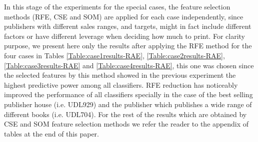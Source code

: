 \documentclass[a4paper,10pt,twocolumn,preprint,3p]{elsarticle}
\begin{document}
In this stage of the experiments for the special cases, the
feature selection methods (RFE, CSE and SOM) are applied for each case
independently, since publishers with different sales ranges, and
targets, might in fact include different factors or have different
leverage when deciding how much to print. For clarity purpose, we present 
here only the results after applying the RFE method for the four cases in Tables
\ref{Table:case1results-RAE}, \ref{Table:case2results-RAE},
\ref{Table:case3results-RAE} and \ref{Table:case4results-RAE}, this
one was chosen since the selected features by this
method showed in the previous experiment the highest predictive power among 
all classifiers. 
%
RFE reduction has noticeably improved the performance of all classifiers 
specially in the case of the best selling publisher house (i.e. UDL929) and the
publisher which publishes a wide range of different books (i.e. UDL704). 
For the rest of the results which are obtained by CSE and SOM feature selection 
methods we refer the reader to the appendix of tables at the end of this paper.  


\begin{table*}[!ht]
\caption{Predicting Total sales for publishing company UDL929 (ReliefFAttributeEval-FS). Best values in bold.}
\centering{}%
\label{Table:case1results-RAE}
\end{table*}
\end{document}
